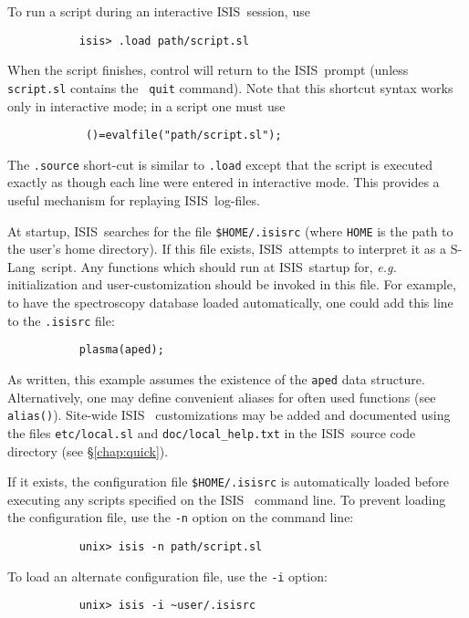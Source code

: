 \documentclass{book}
\newcommand{\isisx}{{\sc ISIS~}}
\newcommand{\slang}{{\sc S-Lang}}
\begin{document}
To run a script during an interactive \isisx session, use
\begin{verbatim}
           isis> .load path/script.sl
\end{verbatim}
When the script finishes, control will
return to the \isisx prompt (unless {\tt script.sl} contains the {\tt
quit} command).  Note that this shortcut syntax works only in interactive
mode; in a script one must use
\begin{verbatim}
            ()=evalfile("path/script.sl");
\end{verbatim}
The {\tt .source} short-cut is similar to {\tt .load} except that
the script is executed exactly as though each line were entered in
interactive mode.  This provides a useful mechanism for replaying
\isisx log-files.

At startup, \isisx searches for the file {\tt \$HOME/.isisrc} (where
{\tt HOME} is the path to the user's home directory).  If this file
exists, \isisx attempts to interpret it as a \slang{}ript.  Any
functions which should run at \isisx startup for, {\it e.g.}
initialization and user-customization should be invoked in this file.
For example, to have the spectroscopy database
loaded automatically, one could add this line to the {\tt .isisrc} file:
\begin{verbatim}
           plasma(aped);
\end{verbatim}
As written, this example assumes the existence of the {\tt aped}
data structure. Alternatively, one may define convenient aliases for
often used functions (see {\tt alias()}).  Site-wide \isisx
customizations may be added and documented using the files
{\tt etc/local.sl} and {\tt doc/local\_help.txt} in the \isisx source
code directory (see \S\ref{chap:quick}).

If it exists, the configuration file {\tt \$HOME/.isisrc} is automatically
loaded before executing any scripts specified on the \isisx
command line.  To prevent loading the configuration file,
use the {\tt -n} option on the command line:
\begin{verbatim}
           unix> isis -n path/script.sl
\end{verbatim}
To load an alternate configuration file, use the \verb|-i| option:
\begin{verbatim}
           unix> isis -i ~user/.isisrc
\end{verbatim}
\end{document}
